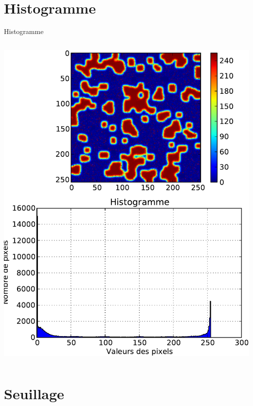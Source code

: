 \documentclass[8pt,a4paper]{beamer}
\begin{document}
\section{Histogramme}

\begin{frame}[containsverbatim]{Histogramme}
  \begin{columns}
  \includegraphics[width=\textwidth]{figures/histogram.pdf} 
  
    \end{columns}
\end{frame}  


\section{Seuillage}
\end{document}
